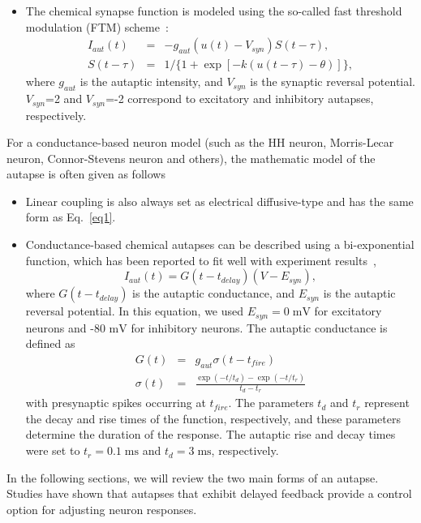 \documentclass[twocolumn,showpacs,preprintnumbers,amsmath,amssymb,pre,superscriptaddress]{revtex4-1}
\begin{document}
\begin{CJK}{UTF8}{gbsn}
\begin{itemize}
\item The chemical synapse function is modeled using the so-called fast threshold modulation (FTM) scheme~\cite{Belykh,buric}:
\begin{eqnarray}
I_{aut}(t)&=&-g_{aut}(u(t)-V_{syn})S(t-\tau), \\
S(t-\tau)&=&1/\{1+\exp[-k(u(t-\tau)-\theta)]\},
\end{eqnarray}
where $g_{aut}$ is the autaptic intensity, and $V_{syn}$ is the synaptic reversal potential. $V_{syn}$=2 and $V_{syn}$=-2 correspond to excitatory and inhibitory autapses, respectively.
\end{itemize}

For a conductance-based neuron model (such as the HH neuron, Morris-Lecar neuron, Connor-Stevens neuron and others), the mathematic model of the autapse is often given as follows~\cite{liyy,hashemi,wht_jtb,wht_chaos}
\begin{itemize}
\item Linear coupling is also always set as electrical diffusive-type and has the same form as Eq.~\ref{eq1}.
\item Conductance-based chemical autapses can be described using a bi-exponential function, which has been reported to fit well with experiment results~\cite{william},
 \begin{equation}
 I_{aut}(t)=G(t-t_{delay})(V-E_{syn}),
\label{chemsyn}
 \end{equation}
where $G(t-t_{delay})$ is the autaptic conductance, and $E_{syn}$ is the autaptic reversal potential. In this equation, we used $E_{syn}=0\;\mathrm{mV}$ for excitatory neurons and -80 $\mathrm{mV}$ for inhibitory neurons. The autaptic conductance is defined as
\begin{eqnarray}
G(t)&=&g_{aut}\sigma(t-t_{fire})\\
\sigma(t)&=&\frac{\exp(-t/t_d)-\exp(-t/t_r)}{t_d-t_r}
\end{eqnarray}
with presynaptic spikes occurring at $t_{fire}$. The parameters $t_d$ and $t_r$ represent the decay and rise times of the function, respectively, and these parameters determine the duration of the response. The autaptic rise and decay times were set to $t_r=0.1\;\mathrm{ms}$ and $t_d=3\;\mathrm{ms}$, respectively. 
\end{itemize}

In the following sections, we will review the two main forms of an autapse. Studies have shown that autapses that exhibit delayed feedback provide a control option for adjusting neuron responses.




\end{CJK}
\end{document}
